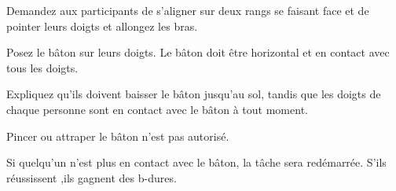 \documentclass{grand-jeu}
\begin{document}
\begin{liste-materiel}
\end{liste-materiel}

\begin{regles}
Demandez aux participants de s’aligner sur deux rangs se faisant face et de pointer leurs doigts et allongez les bras.

Posez le bâton sur leurs doigts. Le bâton doit être horizontal et en contact avec tous les doigts.

Expliquez qu’ils doivent baisser le bâton jusqu’au sol, tandis que les doigts de chaque personne sont en contact avec le bâton à tout moment.

Pincer ou attraper le bâton n’est pas autorisé.

Si quelqu’un n’est plus en contact avec le bâton, la tâche sera redémarrée.
S'ils réussissent ,ils gagnent des b-dures.
\end{regles}

\begin{moments-stop}
\end{moments-stop}
\end{document}
